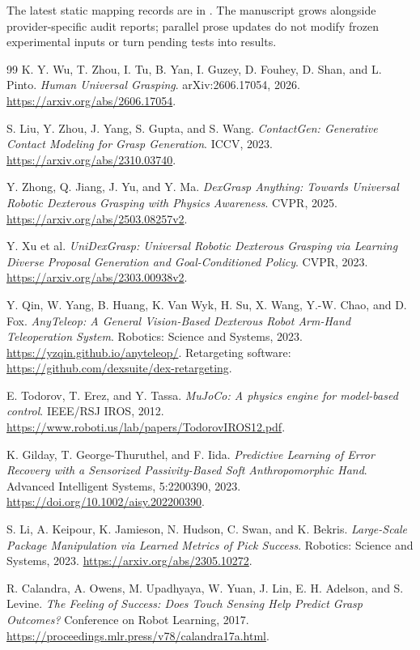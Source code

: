 \documentclass[10pt,letterpaper]{article}
\begin{document}
The latest static mapping records are in .
The manuscript grows alongside provider-specific audit reports; parallel prose
updates do not modify frozen experimental inputs or turn pending tests into results.

\begin{thebibliography}{99}
K. Y. Wu, T. Zhou, I. Tu, B. Yan, I. Guzey, D. Fouhey, D. Shan, and L. Pinto.
\emph{Human Universal Grasping}. arXiv:2606.17054, 2026.
\url{https://arxiv.org/abs/2606.17054}.

S. Liu, Y. Zhou, J. Yang, S. Gupta, and S. Wang.
\emph{ContactGen: Generative Contact Modeling for Grasp Generation}.
ICCV, 2023. \url{https://arxiv.org/abs/2310.03740}.

Y. Zhong, Q. Jiang, J. Yu, and Y. Ma.
\emph{DexGrasp Anything: Towards Universal Robotic Dexterous Grasping
with Physics Awareness}.
CVPR, 2025. \url{https://arxiv.org/abs/2503.08257v2}.

Y. Xu et al.
\emph{UniDexGrasp: Universal Robotic Dexterous Grasping via Learning
Diverse Proposal Generation and Goal-Conditioned Policy}.
CVPR, 2023. \url{https://arxiv.org/abs/2303.00938v2}.

Y. Qin, W. Yang, B. Huang, K. Van Wyk, H. Su, X. Wang, Y.-W. Chao, and D. Fox.
\emph{AnyTeleop: A General Vision-Based Dexterous Robot Arm-Hand Teleoperation
System}. Robotics: Science and Systems, 2023.
\url{https://yzqin.github.io/anyteleop/}. Retargeting software:
\url{https://github.com/dexsuite/dex-retargeting}.

E. Todorov, T. Erez, and Y. Tassa.
\emph{MuJoCo: A physics engine for model-based control}. IEEE/RSJ IROS, 2012.
\url{https://www.roboti.us/lab/papers/TodorovIROS12.pdf}.

K. Gilday, T. George-Thuruthel, and F. Iida.
\emph{Predictive Learning of Error Recovery with a Sensorized Passivity-Based
Soft Anthropomorphic Hand}. Advanced Intelligent Systems, 5:2200390, 2023.
\url{https://doi.org/10.1002/aisy.202200390}.

S. Li, A. Keipour, K. Jamieson, N. Hudson, C. Swan, and K. Bekris.
\emph{Large-Scale Package Manipulation via Learned Metrics of Pick Success}.
Robotics: Science and Systems, 2023.
\url{https://arxiv.org/abs/2305.10272}.

R. Calandra, A. Owens, M. Upadhyaya, W. Yuan, J. Lin, E. H. Adelson, and S. Levine.
\emph{The Feeling of Success: Does Touch Sensing Help Predict Grasp Outcomes?}
Conference on Robot Learning, 2017.
\url{https://proceedings.mlr.press/v78/calandra17a.html}.


\end{thebibliography}
\end{document}
